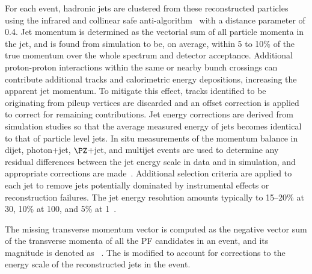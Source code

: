 \documentclass[11pt,twoside,a4paper,cmspaper,final,collab]{cms-tdr}
\begin{document}
For each event, hadronic jets are clustered from these reconstructed particles using the infrared and collinear safe anti-\kt algorithm~\cite{Cacciari:2008gp, Cacciari:2011ma} with a distance parameter of 0.4. Jet momentum is determined as the vectorial sum of all particle momenta in the jet, and is found from simulation to be, on average, within 5 to 10\% of the true momentum over the whole \pt spectrum and detector acceptance. Additional proton-proton interactions within the same or nearby bunch crossings can contribute additional tracks and calorimetric energy depositions, increasing the apparent jet momentum. To mitigate this effect, tracks identified to be originating from pileup vertices are discarded and an offset correction is applied to correct for remaining contributions. Jet energy corrections are derived from simulation studies so that the average measured energy of jets becomes identical to that of particle level jets. In situ measurements of the momentum balance in dijet, photon+jet, $\PZ$+jet, and multijet events are used to determine any residual differences between the jet energy scale in data and in simulation, and appropriate corrections are made~\cite{Khachatryan:2016kdb}. Additional selection criteria are applied to each jet to remove jets potentially dominated by instrumental effects or reconstruction failures. The jet energy resolution amounts typically to 15--20\% at 30\GeV, 10\% at 100\GeV, and 5\% at 1\TeV~\cite{Khachatryan:2016kdb}.


The missing transverse momentum vector \ptvecmiss is computed as the negative vector sum 
of the transverse momenta of all the PF candidates in an event, 
and its magnitude is denoted as \ptmiss~\cite{METperformance}. 
The \ptvecmiss is modified to account for corrections to the energy scale of the reconstructed jets in the event.
\end{document}
